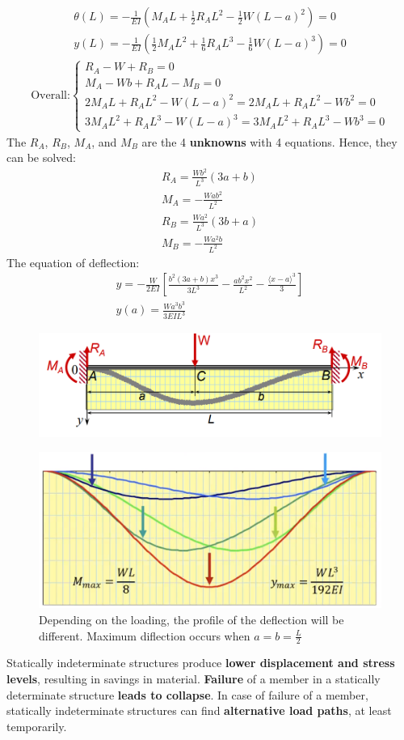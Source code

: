 \documentclass[class=report, crop=false, 12pt,a4paper]{standalone}
\begin{document}
\begin{gather}
  \theta(L) = -\frac{1}{EI}\left(M_AL+\frac{1}{2}R_AL^2-\frac{1}{2}W(L-a)^2\right) = 0 \\
  y(L) = -\frac{1}{EI}\left(\frac{1}{2}M_AL^2+\frac{1}{6}R_AL^3-\frac{1}{6}W(L-a)^3\right) = 0
\end{gather}
\begin{gather}
  \text{Overall:}
  \begin{cases}
    R_A-W+R_B = 0 \\
    M_A-Wb+R_AL-M_B = 0 \\
    2M_AL+R_AL^2-W(L-a)^2 = 2M_AL+R_AL^2-Wb^2 = 0 \\
    3M_AL^2+R_AL^3-W(L-a)^3 = 3M_AL^2+R_AL^3-Wb^3 = 0
  \end{cases}
\end{gather}
The $R_A$, $R_B$, $M_A$, and $M_B$ are the 4 \textbf{unknowns} with 4 equations. Hence, they can be solved:
\begin{gather}
  R_A = \frac{Wb^2}{L^3}(3a+b) \\
  M_A = -\frac{Wab^2}{L^2} \\
  R_B = \frac{Wa^2}{L^3}(3b+a) \\
  M_B = -\frac{Wa^2b}{L^2}
\end{gather}
The equation of deflection:
\begin{gather}
  y = -\frac{W}{2EI}\left[\frac{b^2(3a+b)x^3}{3L^3}-\frac{ab^2x^2}{L^2}-\frac{\langle x-a \rangle^3}{3}\right] \\
  y(a) = \frac{Wa^3b^3}{3EIL^3}
\end{gather}
\begin{figure}[H]
  \centering
  \includegraphics[width = 0.9 \textwidth]{../img/graph2.PNG}
\end{figure}
\begin{figure}[H]
  \centering
  \includegraphics[width = 0.8 \textwidth]{../img/graph3.PNG}
  \caption{Depending on the loading, the profile of the deflection will be different. Maximum diflection occurs when $a=b=\frac{L}{2}$}
\end{figure}
Statically indeterminate structures produce \textbf{lower displacement and stress levels}, resulting in savings in material.
\textbf{Failure} of a member in a statically determinate structure \textbf{leads to collapse}. In case of failure of a member, statically indeterminate structures can find \textbf{alternative load paths}, at least temporarily.
\end{document}
